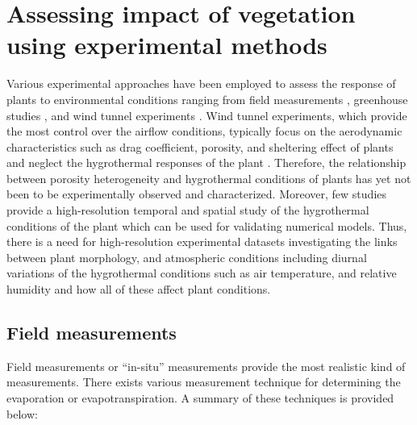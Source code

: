 %
%
%


\section{Assessing impact of vegetation using experimental methods}

Various experimental approaches have been employed to assess the response of plants to environmental conditions ranging from field measurements \citep{Dellwik2019,Grant1998,Hagishima2007,Koizumi2016,Shashua-Bar2009b,Shashua-Bar2000a,Yuan2017}, greenhouse studies \citep{Fatnassi2006,Ganguly2009,Majdoubi2009,Montero2001}, and wind tunnel experiments \citep{Grace1977,Liu2018,Manickathan2018b,Miri2019,Rudnicki2004,Vollsinger2005,Yue2008}. Wind tunnel experiments, which provide the most control over the airflow conditions, typically focus on the aerodynamic characteristics such as drag coefficient, porosity, and sheltering effect of plants and neglect the hygrothermal responses of the plant \citep{Grace1977,Manickathan2018b}. Therefore, the relationship between porosity heterogeneity and hygrothermal conditions of plants has yet not been to be experimentally observed and characterized. Moreover, few studies provide a high-resolution temporal and spatial study of the hygrothermal conditions of the plant which can be used for validating numerical models. Thus, there is a need for high-resolution experimental datasets investigating the links between plant morphology, and atmospheric conditions including diurnal variations of the hygrothermal conditions such as air temperature, and relative humidity and how all of these affect plant conditions. 

\subsection{Field measurements}
Field measurements or ``in-situ'' measurements provide the most realistic kind of measurements. There exists various measurement technique for determining the evaporation or evapotranspiration. A summary of these techniques is provided below:

